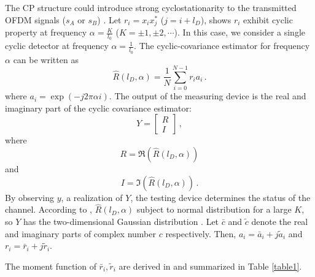 The CP structure could introduce strong cyclostationarity to the transmitted OFDM signals ($s_A$ or $s_B$) \cite{lunden2010robust}. 
Let $r_i=x_ix_j^\ast$ ($j=i+l_D$), \cite{lunden2007spectrum} shows $r_i$ exhibit cyclic property at frequency $\alpha = \frac{K}{l_0}$ ($K = \pm1, \pm2, \cdots$). In this case, we consider a single cyclic detector at frequency $\alpha = \frac{1}{l_0}$. 
The cyclic-covariance estimator for frequency $\alpha$ can be written as
\begin{equation}
  \hat{R}(l_D, \alpha) = \frac{1}{N}\sum_{i=0}^{N-1} r_ia_i\,.
  \label{cyclicR}
\end{equation}
where $a_i = \exp(-j2\pi\alpha i)$. 
The output of the measuring device is the real and imaginary part of the cyclic covariance estimator: 
\begin{equation}
  Y = \begin{bmatrix}
	R \\
	I
   \end{bmatrix}\,,
  \label{cyclic_cov}
\end{equation}
where 
\[
  R = \Re(\hat{R}(l_D, \alpha))
\]
and 
\[
I = \Im(\hat{R}(l_D, \alpha))\,.
\]
By observing $y$, a realization  of $Y$, the testing device determines the status of the channel.
According to \cite{lunden2010robust}, $\hat{R}(l_D, \alpha)$ subject to normal distribution for a large $K$, so $Y$ has the two-dimensional Gaussian distribution \cite{goodman1963statistical}.
Let $\bar{c}$ and $\tilde{c}$ denote the real and imaginary parts of complex number $c$ respectively. Then, $a_i = \bar{a}_i + j\tilde{a}_i$  and $r_i = \bar{r}_i + j\tilde{r}_i$. 

The moment function of $\bar{r}_i, \tilde{r}_i$ are derived in \cite{axell2011optimal} and summarized in Table \ref{table1}.

